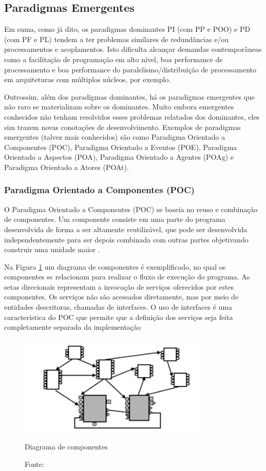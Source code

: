 \subsection{Paradigmas Emergentes}

Em suma, como já dito, os paradigmas dominantes PI (com PP e POO) e PD (com PF e
PL) tendem a ter problemas similares de redundâncias e/ou processamentos e
acoplamentos. Isto dificulta alcançar demandas contemporâneas como a facilitação
de programação em alto nível, boa performance de processamento e boa performance
do paralelismo/distribuição de processamento em arquiteturas com múltiplos
núcleos, por exemplo. 

Outrossim, além dos paradigmas dominantes, há os paradigmas emergentes que não
raro se materializam sobre os dominantes. Muito embora emergentes conhecidos não
tenham resolvidos esses problemas relatados dos dominantes, eles sim trazem
novas conotações de desenvolvimento. Exemplos de paradigmas emergentes (talvez
mais conhecidos) são como Paradigma Orientado a Componentes (POC), Paradigma
Orientado a Eventos (POE), Paradigma Orientado a Aspectos (POA), Paradigma
Orientado a Agentes (POAg) e Paradigma Orientado a Atores (POAt).


\subsubsection{Paradigma Orientado a Componentes (POC)}

O Paradigma Orientado a Componentes (POC) se baseia no reuso e combinação de
componentes. Um componente consiste em uma parte do programa desenvolvida de
forma a ser altamente reutilizável, que pode ser desenvolvida independentemente
para ser depois combinada com outras partes objetivando construir uma unidade
maior \cite{dsouza_1998}.

Na Figura \ref{fig:componentes} um diagrama de componentes é exemplificado, no
qual os componentes se relacionam para realizar o fluxo de execução do programa.
As setas direcionais representam a invocação de serviços oferecidos por estes
componentes. Os serviços não são acessados diretamente, mas por meio de
entidades descritoras, chamadas de interfaces. O uso de interfaces é uma
característica do POC que permite que a definição dos serviços seja feita
completamente separada da implementação \cite{crnkovic_2002}

\begin{figure}[!htb]
  \centering
  \includegraphics[width=0.8\textwidth]{../figures/componentes.png}
  \caption{Diagrama de componentes}
  \caption*{Fonte: }
  \label{fig:componentes}
\end{figure}

